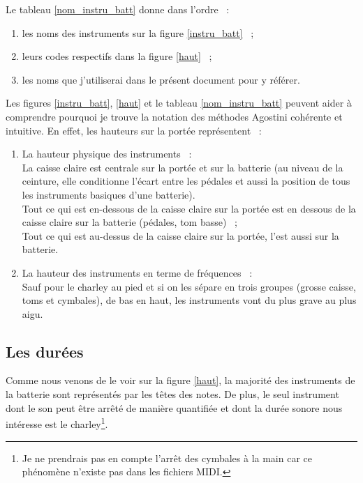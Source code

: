 Le tableau \ref{nom_instru_batt} donne dans l’ordre~ :
\begin{enumerate}
    \item les noms des instruments sur la figure \ref{instru_batt}~ ;
    \item leurs codes respectifs dans la figure \ref{haut}~ ;
    \item les noms que j’utiliserai dans le présent document pour y référer.
\end{enumerate}
Les figures \ref{instru_batt}, \ref{haut} et le tableau \ref{nom_instru_batt}
peuvent aider à comprendre pourquoi je trouve la notation des méthodes Agostini
cohérente et intuitive. En effet, les hauteurs sur la portée représentent~ :
\begin{enumerate}
	\item La hauteur physique des instruments~ :\\
	La caisse claire est centrale sur la portée et sur la batterie (au niveau
    de la ceinture, elle conditionne l’écart entre les pédales et aussi la
    position de tous les instruments basiques d’une batterie).\\
	Tout ce qui est en-dessous de la caisse claire sur la portée est en dessous de
    la caisse claire sur la batterie (pédales, tom basse)~ ;\\
	Tout ce qui est au-dessus de la caisse claire sur la portée, l’est aussi
    sur la batterie.\\
	\item La hauteur des instruments en terme de fréquences~ :\\
	Sauf pour le charley au pied et si on les sépare en trois groupes
    (grosse caisse, toms et cymbales), de bas en haut, les instruments vont du
    plus grave au plus aigu.
\end{enumerate}

\subsection*{Les durées}
\label{hho}
Comme nous venons de le voir sur la figure \ref{haut}, la majorité des
instruments de la batterie sont représentés par les têtes des notes. De plus, le seul instrument dont le son
peut être arrêté de manière quantifiée et dont la durée sonore nous intéresse
est le charley\footnote{Je ne prendrais pas en compte l’arrêt des cymbales à la
main car ce phénomène n’existe pas dans les fichiers MIDI.}.

